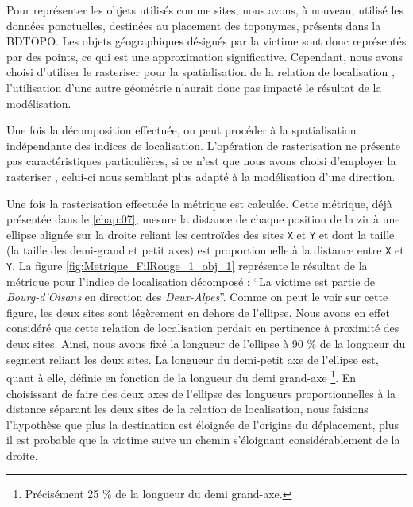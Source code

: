 Pour représenter les objets utilisés comme sites, nous avons, à
nouveau, utilisé les données ponctuelles, destinées au placement des
toponymes, présents dans la BDTOPO. Les objets géographiques désignés
par la victime sont donc représentés par des points, ce qui est une
approximation significative. Cependant, nous avons choisi d'utiliser
le rasteriser  pour la spatialisation de la
relation de localisation
, l'utilisation d'une
autre géométrie n'aurait donc pas impacté le résultat de la
modélisation.

Une fois la décomposition effectuée, on peut procéder à la
spatialisation indépendante des indices de localisation. L'opération
de rasterisation ne présente pas caractéristiques particulières, si ce
n'est que nous avons choisi d'employer la rasteriser
, celui-ci nous semblant plus adapté à la
modélisation d'une direction.

Une fois la rasterisation effectuée la métrique
 est calculée. Cette métrique, déjà
présentée dans le \autoref{chap:07}, mesure la distance de chaque
position de la \ac{zir} à une ellipse alignée sur la droite reliant
les centroïdes des sites \texttt{X} et \texttt{Y} et dont la taille
(\ie la taille des demi-grand et petit axes) est proportionnelle à la
distance entre \texttt{X} et \texttt{Y}. La figure
\ref{fig:Metrique_FilRouge_1_obj_1} représente le résultat de la
métrique pour l'indice de localisation décomposé : \enquote{La victime
  est partie de \emph{Bourg-d'Oisans} en direction des
  \emph{Deux-Alpes}}. Comme on peut le voir sur cette figure, les deux
sites sont légèrement en dehors de l'ellipse. Nous avons en effet
considéré que cette relation de localisation perdait en pertinence à
proximité des deux sites. Ainsi, nous avons fixé la longueur de
l'ellipse à 90 \% de la longueur du segment reliant les deux sites. La
longueur du demi-petit axe de l'ellipse est, quant à elle, définie en
fonction de la longueur du demi grand-axe \footnote{Précisément 25 \%
  de la longueur du demi grand-axe.}. En choisissant de faire des deux
axes de l'ellipse des longueurs proportionnelles à la distance
séparant les deux sites de la relation de localisation, nous faisions
l'hypothèse que plus la destination est éloignée de l'origine du
déplacement, plus il est probable que la victime suive un chemin
s'éloignant considérablement de la droite.

